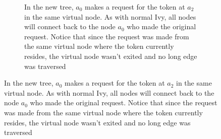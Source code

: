 \documentclass[a4paper, oneside]{discothesis}
\begin{document}
\begin{figure}[H]
\begin{subfigure}[t]{0.5\textwidth}
\caption{In the new tree, $a_{0}$ makes a request for the token at $a_{2}$ in the same virtual node. As with normal Ivy, all nodes will connect back to the node $a_{0}$ who made the original request. Notice that since the request was made from the same virtual node where the token currently resides, the virtual node wasn't exited and no long edge was traversed}
\end{subfigure}
\end{figure}
\end{document}

